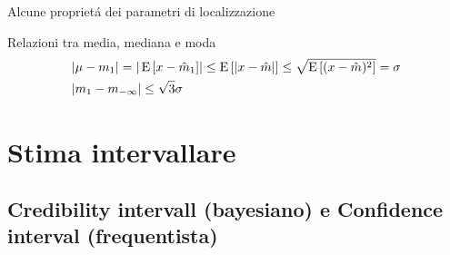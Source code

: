 \begin{wordonframe}{Alcune propriet\'a dei parametri di localizzazione}
\begin{block}{Relazioni tra media, mediana e moda}
\begin{align*}
&|\mu-m_1|=|\operatorname{E}{[x-\hat{m}_1]}|\leq\operatorname{E}{[|x-\hat{m}|]}\leq\sqrt{\operatorname{E}{[(x-\hat{m})^2]}}=\sigma\\
&|m_1-m_{-\infty}|\leq\sqrt{3}\sigma
\end{align*}
\end{block}
\end{wordonframe}

\section{Stima intervallare}

\subsection{Credibility intervall (bayesiano) e Confidence interval (frequentista)}

